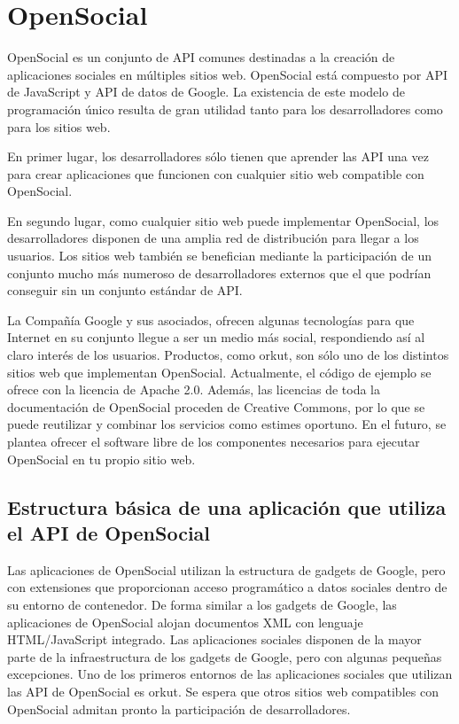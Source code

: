 \section{OpenSocial}
OpenSocial es un conjunto de API comunes destinadas a la creación de aplicaciones sociales en múltiples sitios web. OpenSocial está compuesto por API de JavaScript y API de datos de Google. La existencia de este modelo de programación único resulta de gran utilidad tanto para los desarrolladores como para los sitios web. 
\bigskip
\par
En primer lugar, los desarrolladores sólo tienen que aprender las API una vez para crear aplicaciones que funcionen con cualquier sitio web compatible con OpenSocial. 
\bigskip
\par
En segundo lugar, como cualquier sitio web puede implementar OpenSocial, los desarrolladores disponen de una amplia red de distribución para llegar a los usuarios. Los sitios web también se benefician mediante la participación de un conjunto mucho más numeroso de desarrolladores externos que el que podrían conseguir sin un conjunto estándar de API. 
\bigskip
\par
La Compañía Google y sus asociados, ofrecen algunas tecnologías para que Internet en su conjunto llegue a ser un medio más social, respondiendo así al claro interés de los usuarios. Productos, como orkut, son sólo uno de los distintos sitios web que implementan OpenSocial. Actualmente, el código de ejemplo se ofrece con la licencia de Apache 2.0. Además, las licencias de toda la documentación de OpenSocial proceden de Creative Commons, por lo que se puede reutilizar y combinar los servicios como estimes oportuno. En el futuro, se plantea ofrecer el software libre de los componentes necesarios para ejecutar OpenSocial en tu propio sitio web.
\subsection{Estructura básica de una aplicación que utiliza el API de OpenSocial}
Las aplicaciones de OpenSocial utilizan la estructura de gadgets de Google, pero con extensiones que proporcionan acceso programático a datos sociales dentro de su entorno de contenedor. De forma similar a los gadgets de Google, las aplicaciones de OpenSocial alojan documentos XML con lenguaje HTML/JavaScript integrado. Las aplicaciones sociales disponen de la mayor parte de la infraestructura de los gadgets de Google, pero con algunas pequeñas excepciones. Uno de los primeros entornos de las aplicaciones sociales que utilizan las API de OpenSocial es orkut. Se espera que otros sitios web compatibles con OpenSocial admitan pronto la participación de desarrolladores.
